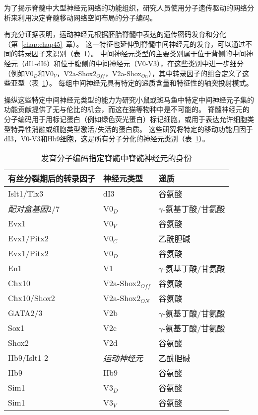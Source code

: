 \begin{proposition} \label{box:33_3}
	
	\quad \quad 为了揭示脊髓中大型神经元网络的功能组织，研究人员使用分子遗传驱动的网络分析来利用决定脊髓移动网络空间布局的分子编码。
	
	\quad \quad 有充分证据表明，运动神经元根据胚胎脊髓中表达的遗传密码发育和分化（第~\ref{chap:chap45}~章）。
	这一特征也延伸到脊髓中间神经元的发育，可以通过不同的转录因子来识别（表~\ref{tab:33_1}）。
	中间神经元类型的主要类别属于位于背侧的中间神经元（dI1-dI6）和位于腹侧的中间神经元（V0-V3），在这些类别中进一步细分（例如V0$_D$和V0$_V$，V2a-Shox2$_{Off}$，V2a-Shox$_{On}$），其中转录因子的组合定义了这些亚型（表~\ref{tab:33_1}）。
	每组中间神经元具有特定的递质含量和特征性的轴突投射模式。
	
	\quad \quad 操纵这些特定中间神经元类型的能力为研究小鼠或斑马鱼中特定中间神经元子集的功能贡献提供了无与伦比的机会，而这在猫等物种中是不可能的。
	脊髓神经元的分子编码用于用标记蛋白（例如绿色荧光蛋白）标记细胞，或用于表达允许细胞类型特异性消融或细胞类型激活/失活的蛋白质。
	这些研究将特定的移动功能归因于dI3，V0-V3和Hb9细胞，这是所有分子分化的神经元类别（表~\ref{tab:33_1}）。
	
\end{proposition}


\begin{table}[htbp]
	\caption{发育分子编码指定脊髓中脊髓神经元的身份} \label{tab:33_1} \centering
	\begin{tabular}{lll}
		\toprule
		有丝分裂期后的转录因子 & 神经元类型 & 递质 \\
		\midrule
		Islt1/Tlx3 & dI3 & 谷氨酸  \\
		\textit{配对盒基因}2/7 & V0$_D$ & $\gamma$-氨基丁酸/甘氨酸  \\
		Evx1 & V0$_V$ & 谷氨酸  \\
		Evx1/Pitx2 & V0$_C$ & 乙酰胆碱  \\
		Evx1/Pitx2 & V0$_D$ & 谷氨酸  \\
		En1 & V1 & $\gamma$-氨基丁酸/甘氨酸  \\
		Chx10 & V2a-Shox2$_{Off}$ & 谷氨酸  \\
		Chx10/Shox2 & V2a-Shox2$_{ON}$ & 谷氨酸  \\
		GATA2/3 & V2b & $\gamma$-氨基丁酸/甘氨酸  \\
		Sox1 & V2c & $\gamma$-氨基丁酸/甘氨酸  \\
		Shox2 & V2d & 谷氨酸  \\
		Hb9/Islt1-2 & \textit{运动神经元} & 乙酰胆碱  \\
		Hb9 & Hb9 & 谷氨酸  \\
		Sim1 & V3$_D$ & 谷氨酸  \\
		Sim1 & V3$_V$ & 谷氨酸  \\
		\bottomrule
	\end{tabular}
\end{table}


